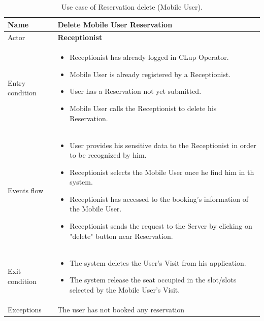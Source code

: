 \begin{table}[H]\begin{tabular}{|p{5cm} | p{7cm} | }
	\hline
	Name & \textbf{Delete Mobile User Reservation} \\
	\hline
	Actor & \textbf{Receptionist} \\
	\hline
	Entry condition &
	\begin{itemize}
		\item Receptionist has already logged in CLup Operator. 
 		\item Mobile User is already registered by a Receptionist.
		\item User has a Reservation not yet submitted. 
        \item Mobile User calls the Receptionist to delete his Reservation.
	\end{itemize} \\
	\hline
	Events flow & 
	\begin{itemize}
		\item User provides his sensitive data to the Receptionist in order to be recognized by him. 
        \item Receptionist selects the Mobile User once he find him in th system.
		\item Receptionist has accessed to the booking's information of the Mobile User.
        \item Receptionist sends the request to the Server by clicking on "delete" button near Reservation.
	\end{itemize} \\
	\hline
	Exit condition & \begin{itemize}
	\item The system deletes the User’s Visit from his application.
    \item The system release the seat occupied in the slot/slots selected by the Mobile User’s Visit. \end{itemize} \\
	\hline 
	Exceptions & 
	The user has not booked any reservation \\
	\hline
\end{tabular}
\caption{Use case of Reservation delete (Mobile User).}
\end{table}
\bigbreak

